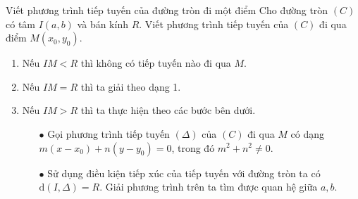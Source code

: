 \begin{dang}{Viết phương trình tiếp tuyến của đường tròn đi một điểm}
	Cho đường tròn $(C)$ có tâm $I(a,b)$ và bán kính $R$. Viết phương trình tiếp tuyến của $(C)$ đi qua điểm $M(x_0,y_0)$.
	
	\begin{enumerate}
		\item Nếu $IM<R$ thì không có tiếp tuyến nào đi qua $M$.
		\item Nếu $IM=R$ thì ta giải theo dạng 1.
		\item Nếu $IM>R$ thì ta thực hiện theo các bước bên dưới.
		\begin{enumerate}
			\item[$ \bullet $] Gọi phương trình tiếp tuyến $(\Delta)$ của $(C)$ đi qua $M$ có dạng $m(x-x_0)+n(y-y_0)=0$, trong đó $m^2+n^2 \neq 0$.
			\item [$ \bullet $]Sử dụng điều kiện tiếp xúc của tiếp tuyến với đường tròn ta có $\mathrm{d}(I,\Delta)=R$. Giải phương trình trên ta tìm được quan hệ giữa $a,b$.
		\end{enumerate}
	\end{enumerate}
	
\end{dang}

